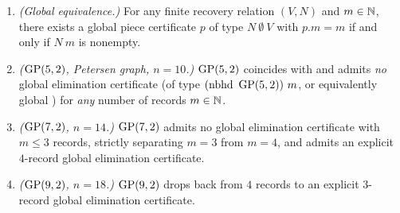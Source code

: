 \begin{proposition}\label{prop:GP}
\begin{enumerate}
\item \emph{(Global equivalence.)} For any finite recovery relation $(V, N)$ and $m \in \mathbb{N}$, there exists a global piece
  certificate $p$ of type  $N\ \emptyset\ V$ with $p.m = m$ if and only if
   $N\ m$ is nonempty.
\item \emph{($\operatorname{GP}(5,2)$, Petersen graph, $n = 10$.)} $\operatorname{GP}(5,2)$ coincides with  and
  admits \emph{no} global elimination certificate (of type  $(\mathrm{nbhd}\ \operatorname{GP}(5,2))\ m$, or
  equivalently global ) for \emph{any} number of records $m \in \mathbb{N}$.
\item \emph{($\operatorname{GP}(7,2)$, $n = 14$.)} $\operatorname{GP}(7,2)$ admits no global elimination certificate with $m \le 3$ records, strictly
  separating $m = 3$ from $m = 4$, and admits an explicit $4$-record global elimination certificate.
\item \emph{($\operatorname{GP}(9,2)$, $n = 18$.)} $\operatorname{GP}(9,2)$ drops back from $4$ records to an explicit $3$-record global elimination
  certificate.
\end{enumerate}
\end{proposition}

